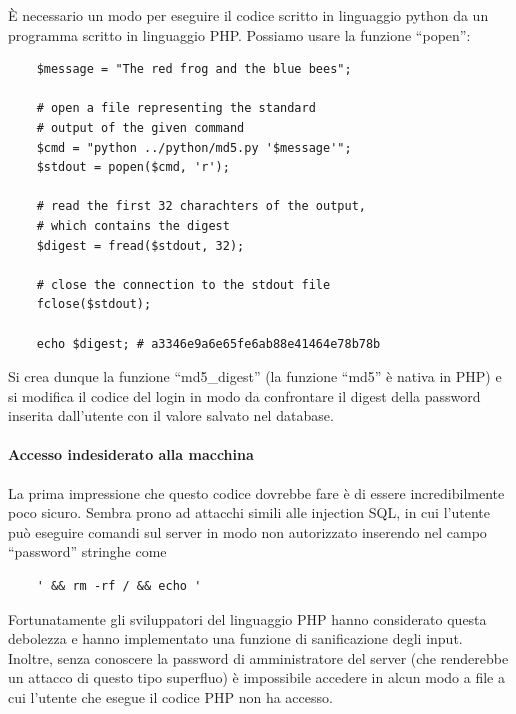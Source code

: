 È necessario un modo per eseguire il codice scritto in linguaggio python da un programma scritto in linguaggio PHP. Possiamo usare la funzione ``popen'':
\lstset{language=php}
\begin{lstlisting}
    $message = "The red frog and the blue bees";

    # open a file representing the standard 
    # output of the given command
    $cmd = "python ../python/md5.py '$message'";
    $stdout = popen($cmd, 'r');
    
    # read the first 32 charachters of the output,
    # which contains the digest
    $digest = fread($stdout, 32);

    # close the connection to the stdout file
    fclose($stdout);

    echo $digest; # a3346e9a6e65fe6ab88e41464e78b78b
\end{lstlisting}

Si crea dunque la funzione ``md5\_digest'' (la funzione ``md5'' è nativa in PHP) e si modifica il codice del login in modo da confrontare il digest della password inserita dall'utente con il valore salvato nel database.

\paragraph{Accesso indesiderato alla macchina}
La prima impressione che questo codice dovrebbe fare è di essere incredibilmente poco sicuro. Sembra prono ad attacchi simili alle injection SQL, in cui l'utente può eseguire comandi sul server in modo non autorizzato inserendo nel campo ``password'' stringhe come
\begin{verbatim}
    ' && rm -rf / && echo '
\end{verbatim}

Fortunatamente gli sviluppatori del linguaggio PHP hanno considerato questa debolezza e hanno implementato una funzione di sanificazione degli input. Inoltre, senza conoscere la password di amministratore del server (che renderebbe un attacco di questo tipo superfluo) è impossibile accedere in alcun modo a file a cui l'utente che esegue il codice PHP non ha accesso.
